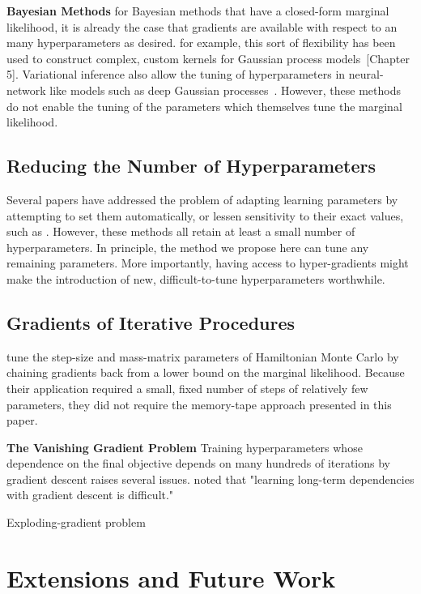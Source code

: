 \documentclass{article}
\begin{document}
\textbf{Bayesian Methods}
for Bayesian methods that have a closed-form marginal likelihood, it is already the case that gradients are available with respect to an many hyperparameters as desired.
for example, this sort of flexibility has been used to construct complex, custom kernels for Gaussian process models~\cite{rasmussen38gaussian}[Chapter 5].
Variational inference also allow the tuning of hyperparameters in neural-network like models such as deep Gaussian processes~\citep{deepGPVar14}.
However, these methods do not enable the tuning of the parameters which themselves tune the marginal likelihood.

\subsection{Reducing the Number of Hyperparameters}
Several papers have addressed the problem of adapting learning parameters by attempting to set them automatically, or lessen sensitivity to their exact values, such as \cite{schaul2012no, Adam14, Adasecant14, Hotswap14}.
However, these methods all retain at least a small number of hyperparameters.
In principle, the method we propose here can tune any remaining parameters.
More importantly, having access to hyper-gradients might make the introduction of new, difficult-to-tune hyperparameters worthwhile.

\subsection{Gradients of Iterative Procedures}

\citet{Bridging14} tune the step-size and mass-matrix parameters of Hamiltonian Monte Carlo by chaining gradients back from a lower bound on the marginal likelihood.
Because their application required a small, fixed number of steps of relatively few parameters, they did not require the memory-tape approach presented in this paper.

\textbf{The Vanishing Gradient Problem}
Training hyperparameters whose dependence on the final objective depends on many hundreds of iterations by gradient descent raises several issues.
\citet{bengio1994learning} noted that "learning long-term dependencies with gradient descent is difficult."

Exploding-gradient problem~\cite{pascanu2012understanding}

\section{Extensions and Future Work}
\end{document}
